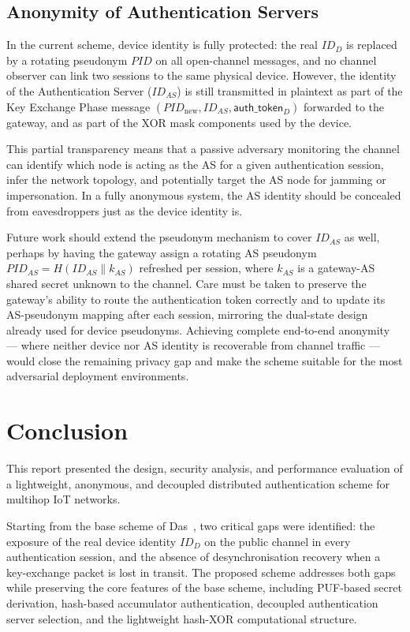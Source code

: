 \documentclass[12pt,a4paper]{report}
\begin{document}
\section{Anonymity of Authentication Servers}

In the current scheme, device identity is fully protected: the real $ID_D$ is
replaced by a rotating pseudonym $\mathit{PID}$ on all open-channel messages,
and no channel observer can link two sessions to the same physical device.
However, the identity of the Authentication Server ($ID_{AS}$) is still
transmitted in plaintext as part of the Key Exchange Phase message
$(\mathit{PID}_{\mathrm{new}}, ID_{AS}, \mathsf{auth\_token}_D)$ forwarded to
the gateway, and as part of the XOR mask components used by the device.

This partial transparency means that a passive adversary monitoring the channel
can identify which node is acting as the AS for a given authentication session,
infer the network topology, and potentially target the AS node for jamming or
impersonation.
In a fully anonymous system, the AS identity should be concealed from
eavesdroppers just as the device identity is.

Future work should extend the pseudonym mechanism to cover $ID_{AS}$ as well,
perhaps by having the gateway assign a rotating AS pseudonym
$\mathit{PID}_{AS} = H(ID_{AS} \| k_{AS})$ refreshed per session,
where $k_{AS}$ is a gateway-AS shared secret unknown to the channel.
Care must be taken to preserve the gateway's ability to route the authentication
token correctly and to update its AS-pseudonym mapping after each session,
mirroring the dual-state design already used for device pseudonyms.
Achieving complete end-to-end anonymity — where neither device nor AS identity
is recoverable from channel traffic — would close the remaining privacy gap and
make the scheme suitable for the most adversarial deployment environments.

\chapter{Conclusion}

This report presented the design, security analysis, and performance evaluation of a
lightweight, anonymous, and decoupled distributed authentication scheme for multihop
IoT networks.

Starting from the base scheme of Das~\cite{das2026comsnets}, two critical gaps were
identified: the exposure of the real device identity $ID_D$ on the public channel in
every authentication session, and the absence of desynchronisation recovery when a
key-exchange packet is lost in transit.
The proposed scheme addresses both gaps while preserving the core features of the
base scheme, including PUF-based secret derivation, hash-based accumulator
authentication, decoupled authentication server selection, and the lightweight
hash-XOR computational structure.
\end{document}
